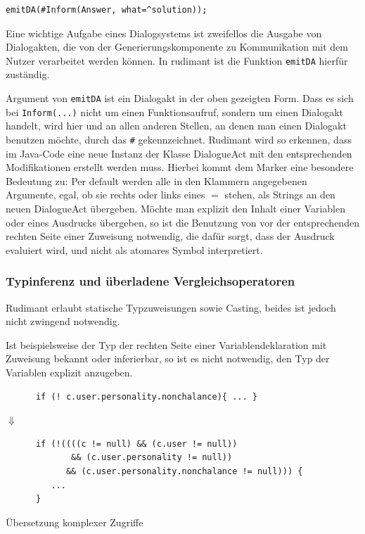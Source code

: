 \begin{small}
\begin{verbatim}
emitDA(#Inform(Answer, what=^solution));
\end{verbatim}
\end{small}
Eine wichtige Aufgabe eines Dialogsystems ist zweifellos die Ausgabe von
Dialogakten, die von der Generierungskomponente zu Kommunikation mit dem Nutzer
verarbeitet werden können. In rudimant ist die Funktion \texttt{emitDA} hierfür
zuständig.

Argument von \texttt{emitDA} ist ein Dialogakt in der oben gezeigten Form. Dass
es sich bei \texttt{Inform}\verb|(...)| nicht um einen Funktionsaufruf, sondern
um einen Dialogakt handelt, wird hier und an allen anderen Stellen, an denen
man einen Dialogakt benutzen möchte, durch das \verb|#|
gekennzeichnet. Rudimant wird so erkennen, dass im Java-Code eine neue Instanz
der Klasse DialogueAct mit den entsprechenden Modifikationen erstellt werden
muss. Hierbei kommt dem Marker \caret{} eine besondere Bedeutung zu: Per
default werden alle in den Klammern angegebenen Argumente, egal, ob sie rechts
oder links eines $=$ stehen, als Strings an den neuen DialogueAct
übergeben. Möchte man explizit den Inhalt einer Variablen oder eines Ausdrucks
übergeben, so ist die Benutzung von \caret{} vor der entsprechenden rechten
Seite einer Zuweisung notwendig, die dafür sorgt, dass der Ausdruck evaluiert
wird, und nicht als atomares Symbol interpretiert.

\subsubsection{Typinferenz und überladene Vergleichsoperatoren}
\label{rudimant-Typinferenz}

Rudimant erlaubt statische Typzuweisungen sowie Casting, beides ist jedoch
nicht zwingend notwendig.

Ist beispielsweise der Typ der rechten Seite einer Variablendeklaration mit
Zuweisung bekannt oder inferierbar, so ist es nicht notwendig, den Typ der
Variablen explizit anzugeben.

\begin{table}[htbp]
  \centering
  \begin{small}
    \begin{BVerbatim}
      if (! c.user.personality.nonchalance){ ... }
    \end{BVerbatim}

    {\Large$\Downarrow$}\\

    \begin{BVerbatim}
      if (!((((c != null) && (c.user != null))
             && (c.user.personality != null))
            && (c.user.personality.nonchalance != null))) {
         ...
      }
\end{BVerbatim}
\end{small}

\caption{Übersetzung komplexer Zugriffe}
\label{tab:multi-predaccess}
\end{table}
\vspace*{10pt}


